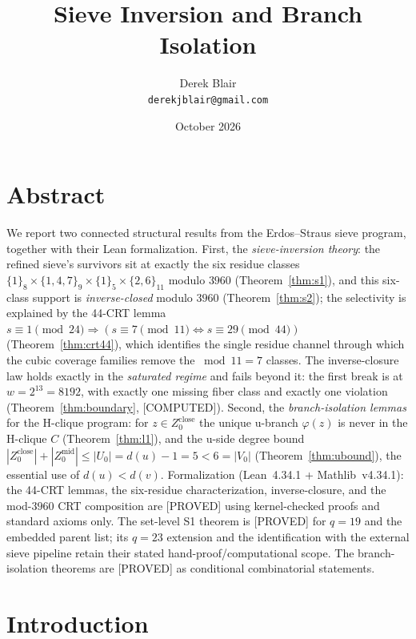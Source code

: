 \documentclass[11pt,a4paper]{article}
\title{Sieve Inversion and Branch Isolation}
\author{Derek Blair \\ \texttt{derekjblair@gmail.com}}
\date{October 2026}
\theoremstyle{definition}
\begin{document}
\maketitle

\section{Abstract}

We report two connected structural results from the Erdos--Straus
sieve program, together with their Lean formalization. First, the
\emph{sieve-inversion theory}: the refined sieve's survivors sit at
exactly the six residue classes
$\{1\}_8\times\{1,4,7\}_9\times\{1\}_5\times\{2,6\}_{11}$ modulo
$3960$ (Theorem~\ref{thm:s1}), and this six-class support is
\emph{inverse-closed} modulo $3960$ (Theorem~\ref{thm:s2}); the
selectivity is explained by the 44-CRT lemma
$s\equiv1\pmod{24}\Rightarrow(s\equiv7\pmod{11}\iff s\equiv29\pmod{44})$
(Theorem~\ref{thm:crt44}), which identifies the single residue channel
through which the cubic coverage families remove the
$\bmod 11=7$ classes. The inverse-closure law holds exactly in the
\emph{saturated regime} and fails beyond it: the first break is at
$w=2^{13}=8192$, with exactly one missing fiber class and exactly one
violation (Theorem~\ref{thm:boundary}, [COMPUTED]).
Second, the \emph{branch-isolation lemmas} for the H-clique program:
for $z\in Z_0^{\mathrm{close}}$ the unique u-branch $\varphi(z)$ is never
in the H-clique $C$ (Theorem~\ref{thm:l1}), and the u-side degree bound
$|Z_0^{\mathrm{close}}|+|Z_0^{\mathrm{mid}}|\le|U_0|=d(u)-1=5<6=|V_0|$
(Theorem~\ref{thm:ubound}), the essential use of $d(u)<d(v)$.
Formalization (Lean~4.34.1 + Mathlib~v4.34.1): the 44-CRT
lemmas, the six-residue characterization, inverse-closure, and the
mod-$3960$ CRT composition are [PROVED] using kernel-checked proofs
and standard axioms only. The set-level S1 theorem is [PROVED] for
$q=19$ and the embedded parent list; its $q=23$ extension and the
identification with the external sieve pipeline retain their stated
hand-proof/computational scope. The branch-isolation theorems are
[PROVED] as conditional combinatorial statements.

\section{Introduction}
\end{document}

